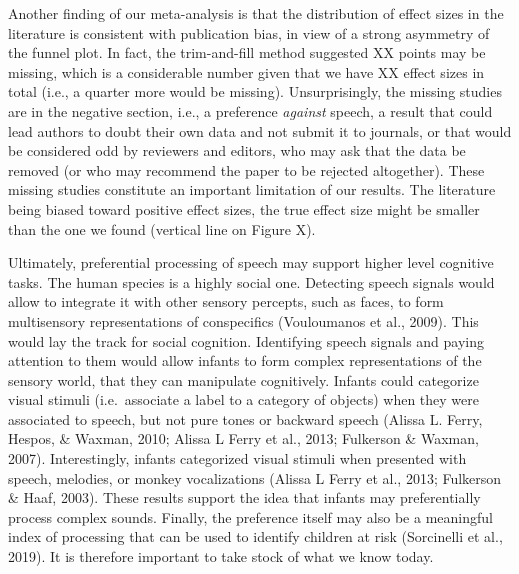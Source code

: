 \documentclass[man]{apa6}
\begin{document}
Another finding of our meta-analysis is that the distribution of effect
sizes in the literature is consistent with publication bias, in view of
a strong asymmetry of the funnel plot. In fact, the trim-and-fill method
suggested XX points may be missing, which is a considerable number given
that we have XX effect sizes in total (i.e., a quarter more would be
missing). Unsurprisingly, the missing studies are in the negative
section, i.e., a preference \emph{against} speech, a result that could
lead authors to doubt their own data and not submit it to journals, or
that would be considered odd by reviewers and editors, who may ask that
the data be removed (or who may recommend the paper to be rejected
altogether). These missing studies constitute an important limitation of
our results. The literature being biased toward positive effect sizes,
the true effect size might be smaller than the one we found (vertical
line on Figure X).

Ultimately, preferential processing of speech may support higher level
cognitive tasks. The human species is a highly social one. Detecting
speech signals would allow to integrate it with other sensory percepts,
such as faces, to form multisensory representations of conspecifics
(Vouloumanos et al., 2009). This would lay the track for social
cognition. Identifying speech signals and paying attention to them would
allow infants to form complex representations of the sensory world, that
they can manipulate cognitively. Infants could categorize visual stimuli
(i.e.~associate a label to a category of objects) when they were
associated to speech, but not pure tones or backward speech (Alissa L.
Ferry, Hespos, \& Waxman, 2010; Alissa L Ferry et al., 2013; Fulkerson
\& Waxman, 2007). Interestingly, infants categorized visual stimuli when
presented with speech, melodies, or monkey vocalizations (Alissa L Ferry
et al., 2013; Fulkerson \& Haaf, 2003). These results support the idea
that infants may preferentially process complex sounds. Finally, the
preference itself may also be a meaningful index of processing that can
be used to identify children at risk (Sorcinelli et al., 2019). It is
therefore important to take stock of what we know today.
\end{document}
